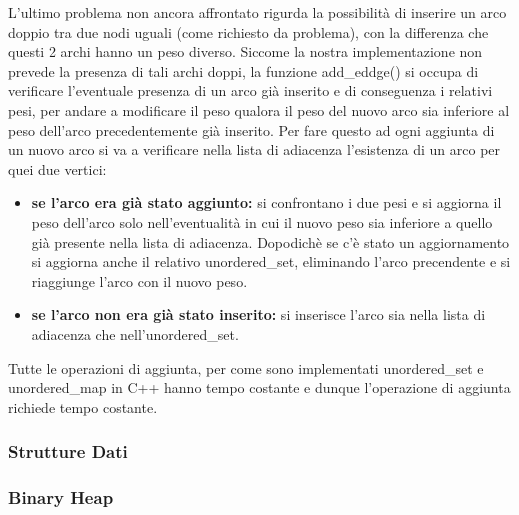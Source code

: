 L'ultimo problema non ancora affrontato rigurda la possibilità di inserire un arco doppio tra due nodi uguali (come richiesto da problema), con la differenza che questi 2 archi hanno un peso diverso. Siccome la nostra implementazione non prevede la presenza di tali archi doppi, la funzione add\_eddge() si occupa di verificare l'eventuale presenza di un arco già inserito e di conseguenza i relativi pesi, per andare a modificare il peso qualora il peso del nuovo arco sia inferiore al peso dell'arco precedentemente già inserito. Per fare questo ad ogni aggiunta di un nuovo arco si va a verificare nella lista di adiacenza l'esistenza di un arco per quei due vertici:
\begin{itemize}
	\item \textbf{se l'arco era già stato aggiunto:} si confrontano i due pesi e si aggiorna il peso dell'arco solo nell'eventualità in cui il nuovo peso sia inferiore a quello già presente nella lista di adiacenza. Dopodichè se c'è stato un aggiornamento si aggiorna anche il relativo unordered\_set, eliminando l'arco precendente e si riaggiunge l'arco con il nuovo peso. 
	\item \textbf{se l'arco non era già stato inserito:} si inserisce l'arco sia nella lista di adiacenza che nell'unordered\_set.
\end{itemize}

Tutte le operazioni di aggiunta, per come sono implementati unordered\_set e unordered\_map in C++ hanno tempo costante e dunque l'operazione di aggiunta richiede tempo costante.


\subsubsection{Strutture Dati}

\subsubsection{Binary Heap}

